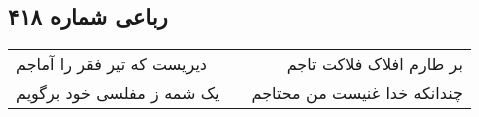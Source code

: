 \begin{center}
\section*{رباعی شماره ۴۱۸}
\label{sec:sh418}
\begin{longtable}{l p{0.5cm} r}
دیریست که تیر فقر را آماجم
&&
بر طارم افلاک فلاکت تاجم
\\
یک شمه ز مفلسی خود برگویم
&&
چندانکه خدا غنیست من محتاجم
\\
\end{longtable}
\end{center}

